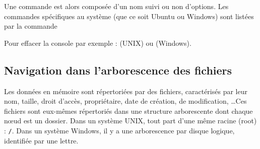 Une commande est alors composée d'un nom suivi ou non d'options. Les commandes spécifiques au système (que ce soit Ubuntu ou Windows) sont listées par la commande 

Pour effacer la console par exemple :  (UNIX) ou  (Windows).

\subsection{Navigation dans l'arborescence des fichiers}

Les données en mémoire sont répertoriées par des fichiers, caractérisés par leur nom, taille, droit d'accès, propriétaire, date de création, de modification, \ldots Ces fichiers sont eux-mêmes répertoriés dans une structure arborescente dont chaque nœud est un dossier. Dans un système UNIX, tout part d'une même racine (root) : \texttt{/}. Dans un système Windows, il y a une arborescence par disque logique, identifiée par une lettre.

